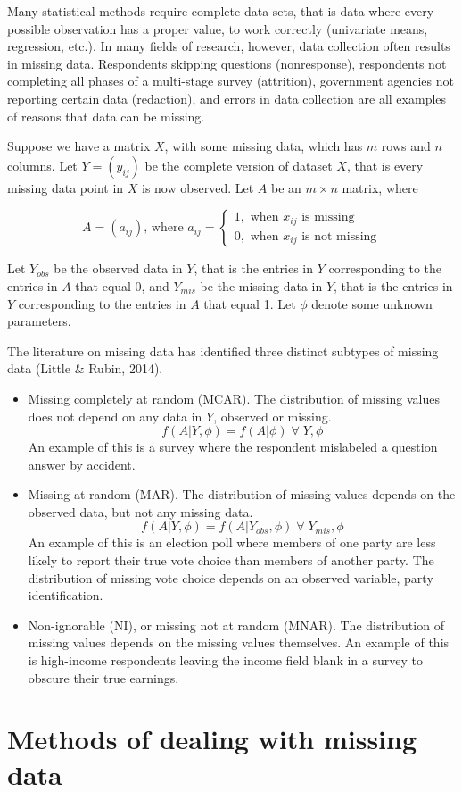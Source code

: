 \documentclass[12pt,twoside]{reedthesis}
\begin{document}
Many statistical methods require complete data sets, that is data where every possible observation has a proper value, to work correctly (univariate means, regression, etc.). In many fields of research, however, data collection often results in missing data. Respondents skipping questions (nonresponse), respondents not completing all phases of a multi-stage survey (attrition), government agencies not reporting certain data (redaction), and errors in data collection are all examples of reasons that data can be missing.

Suppose we have a matrix \(X\), with some missing data, which has \(m\) rows and \(n\) columns. Let \(Y = (y_{ij})\) be the complete version of dataset \(X\), that is every missing data point in \(X\) is now observed. Let \(A\) be an \(m \times n\) matrix, where

\[
A = (a_{ij}) \text{, where } a_{ij} =
\begin{cases}
1, \text{ when }x_{ij}\text{ is missing}\\
0, \text{ when }x_{ij}\text{ is not missing}
\end{cases}
\]

Let \(Y_{obs}\) be the observed data in \(Y\), that is the entries in \(Y\) corresponding to the entries in \(A\) that equal 0, and \(Y_{mis}\) be the missing data in \(Y\), that is the entries in \(Y\) corresponding to the entries in \(A\) that equal 1. Let \(\phi\) denote some unknown parameters.

The literature on missing data has identified three distinct subtypes of missing data (Little \& Rubin, 2014).
\begin{itemize}
\item
  Missing completely at random (MCAR). The distribution of missing values does not depend on any data in \(Y\), observed or missing. \[f(A|Y,\phi) = f(A|\phi) \;\forall\; Y,\phi\] An example of this is a survey where the respondent mislabeled a question answer by accident.
\item
  Missing at random (MAR). The distribution of missing values depends on the observed data, but not any missing data. \[f(A|Y,\phi) = f(A|Y_{obs},\phi) \;\forall\; Y_{mis},\phi\] An example of this is an election poll where members of one party are less likely to report their true vote choice than members of another party. The distribution of missing vote choice depends on an observed variable, party identification.
\item
  Non-ignorable (NI), or missing not at random (MNAR). The distribution of missing values depends on the missing values themselves. An example of this is high-income respondents leaving the income field blank in a survey to obscure their true earnings.
\end{itemize}
\hypertarget{methods-of-dealing-with-missing-data}{%
\section{Methods of dealing with missing data}\label{methods-of-dealing-with-missing-data}}
\end{document}
